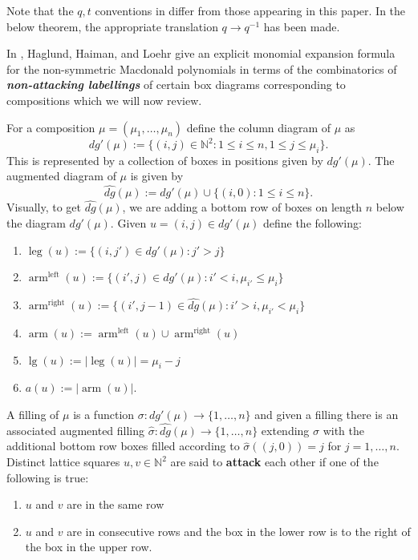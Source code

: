 \documentclass[ALCO,Unicode]{cedram}
\DeclareMathOperator{\mathleft}{left}
\DeclareMathOperator{\mathright}{right}
\DeclareMathOperator{\arm}{arm}
\DeclareMathOperator{\leg}{leg}
\DeclareMathOperator{\mathleg}{lg}
\begin{document}
Note that the $q,t$ conventions in \cite{haglund2007combinatorial} differ from those appearing in this paper. In the below theorem, the appropriate translation $q \rightarrow q^{-1}$ has been made.

In \cite{haglund2007combinatorial}, Haglund, Haiman, and Loehr give an explicit monomial expansion formula for the non-symmetric Macdonald polynomials in terms of the combinatorics of \textbf{\textit{non-attacking labellings}} of certain box diagrams corresponding to compositions which we will now review.

\begin{defi}
For a composition $\mu = (\mu_1,\ldots,\mu_n)$ define the column diagram of $\mu$ as 
$$dg'(\mu):= \{(i,j)\in \mathbb{N}^2 : 1\leq i\leq n, 1\leq j \leq \mu_i \}.$$ This is represented by a collection of boxes in positions given by $dg'(\mu)$. The augmented diagram of $\mu$ is given by 
$$\widehat{dg}(\mu):= dg'(\mu)\cup\{(i,0): 1\leq i\leq n\}.$$
Visually, to get $\widehat{dg}(\mu)$, we are adding a bottom row of boxes on length $n$ below the diagram $dg'(\mu)$. Given $u = (i,j) \in dg'(\mu)$ define the following:
\begin{enumerate}
    \item $\leg(u) := \{(i,j') \in dg'(\mu): j' > j\}$
    \item $\arm^{\mathleft}(u) := \{(i',j) \in dg'(\mu): i'<i, \mu_{i'} \leq \mu_i\} $
    \item $\arm^{\mathright}(u):= \{(i',j-1) \in \widehat{dg}(\mu): i'>i, \mu_{i'}<\mu_{i}\}$
    \item $\arm(u) := \arm^{\mathleft}(u) \cup \arm^{\mathright}(u)$
    \item $\mathleg(u):= |\leg(u)| = \mu_i -j$
    \item $a(u) := |\arm(u)|.$
\end{enumerate}
A filling of $\mu$ is a function $\sigma: dg'(\mu) \rightarrow \{1,\ldots,n\}$ and given a filling there is an associated augmented filling $\widehat{\sigma}: \widehat{dg}(\mu) \rightarrow \{1,\ldots,n\}$ extending $\sigma$ with the additional bottom row boxes filled according to $\widehat{\sigma}((j,0)) = j$ for $j = 1,\ldots,n$. Distinct lattice squares $u,v \in \mathbb{N}^2$ are said to \textbf{attack} each other if one of the following is true:
\begin{enumerate}
\item $u$ and $v$ are in the same row 
\item $u$ and $v$ are in consecutive rows and the box in the lower row is to the right of the box in the upper row.

\end{enumerate}
\end{defi}
\end{document}
